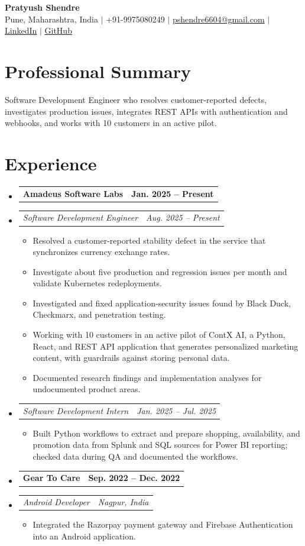 \documentclass[a4paper,11pt]{article}
\makeatletter
\newcommand{\bulletpoint}[1]{\item\small{#1}}
\newcommand{\company}[2]{\item\begin{tabularx}{\textwidth}{@{}Xr@{}}\textbf{#1}& \textbf{#2}\end{tabularx}\vspace{-4pt}}
\newcommand{\role}[2]{\item\begin{tabularx}{\textwidth}{@{}Xr@{}}\textit{\small #1}&\textit{\small #2}\end{tabularx}\vspace{-5pt}}
\makeatother
\begin{document}
\begin{center}
  {\Large\bfseries Pratyush Shendre}\\[2pt]
  \small Pune, Maharashtra, India $|$ +91-9975080249 $|$
  \href{mailto:pshendre6604@gmail.com}{pshendre6604@gmail.com} $|$
  \href{https://www.linkedin.com/in/pratyush-shendre-2256a7223/}{\underline{LinkedIn}} $|$
  \href{https://github.com/PratyushS04}{\underline{GitHub}}
\end{center}

\section{Professional Summary}
\small Software Development Engineer who resolves customer-reported defects, investigates production issues, integrates REST APIs with authentication and webhooks, and works with 10 customers in an active pilot.

\section{Experience}
\begin{itemize}[leftmargin=0in,label={}]
  \company{Amadeus Software Labs}{Jan. 2025 -- Present}
  \role{Software Development Engineer}{Aug. 2025 -- Present}
  \begin{itemize}
    \bulletpoint{Resolved a customer-reported stability defect in the service that synchronizes currency exchange rates.}
    \bulletpoint{Investigate about f{}ive production and regression issues per month and validate Kubernetes redeployments.}
    \bulletpoint{Investigated and f{}ixed application-security issues found by Black Duck, Checkmarx, and penetration testing.}
    \bulletpoint{Working with 10 customers in an active pilot of ContX AI, a Python, React, and REST API application that generates personalized marketing content, with guardrails against storing personal data.}
    \bulletpoint{Documented research f{}indings and implementation analyses for undocumented product areas.}
  \end{itemize}
  \role{Software Development Intern}{Jan. 2025 -- Jul. 2025}
  \begin{itemize}
    \bulletpoint{Built Python workf{}lows to extract and prepare shopping, availability, and promotion data from Splunk and SQL sources for Power BI reporting; checked data during QA and documented the workf{}lows.}
  \end{itemize}
  \company{Gear To Care}{Sep. 2022 -- Dec. 2022}
  \role{Android Developer}{Nagpur, India}
  \begin{itemize}
    \bulletpoint{Integrated the Razorpay payment gateway and Firebase Authentication into an Android application.}
  \end{itemize}
\end{itemize}
\end{document}
